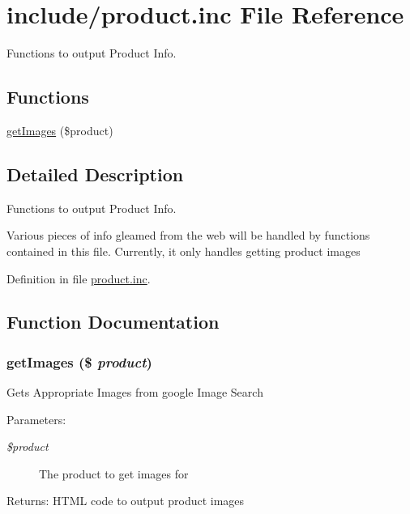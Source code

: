 \hypertarget{product_8inc}{
\section{include/product.inc File Reference}
\label{product_8inc}
}
Functions to output Product Info. 

\subsection*{Functions}
\begin{CompactItemize}
\item 
\hyperlink{product_8inc_9dbb778854cfe105058d7161ca8f058c}{getImages} (\$product)
\end{CompactItemize}


\subsection{Detailed Description}
Functions to output Product Info. 

Various pieces of info gleamed from the web will be handled by functions contained in this file. Currently, it only handles getting product images 

Definition in file \hyperlink{product_8inc-source}{product.inc}.

\subsection{Function Documentation}
\hypertarget{product_8inc_9dbb778854cfe105058d7161ca8f058c}{
\subsubsection{\setlength{\rightskip}{0pt plus 5cm}getImages (\$ {\em product})}}
\label{product_8inc_9dbb778854cfe105058d7161ca8f058c}


Gets Appropriate Images from google Image Search \begin{Desc}
\item[Parameters:]
\begin{description}
\item[{\em \$product}]The product to get images for \end{description}
\end{Desc}
\begin{Desc}
\item[Returns:]HTML code to output product images \end{Desc}


